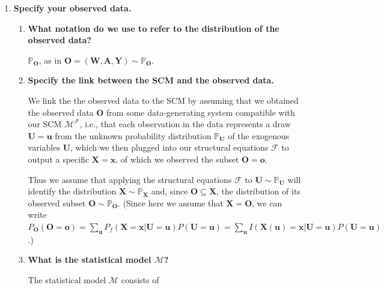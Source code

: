 \documentclass{article}\usepackage[]{graphicx}\usepackage[]{xcolor}
\begin{document}
\begin{enumerate}[label=\textbf{\arabic*.}]

  \item \textbf{Specify your observed data.}
  
  \begin{enumerate}[label=\textbf{(\alph*)}]
  
    \item \textbf{What notation do we use to refer to the distribution of the observed data?}
    
    $\mathbb{P}_{\bm{O}}$, as in $\bm{O} = (\bm{W}, \bm{A}, \bm{Y}) \sim \mathbb{P}_{\bm{O}}.$
  
    \item \textbf{Specify the link between the SCM and the observed data.}
    
We link the the observed data to the SCM by assuming that we obtained the observed data $\bm{O}$ from some data-generating system compatible with our SCM $\mathcal{M}^\mathcal{F}$, i.e., that each observation in the data represents a draw $\bm{U} = \bm{u}$ from the unknown probability distribution $\mathbb{P}_{\bm{U}}$ of the exogenous variables $\bm{U}$, which we then plugged into our structural equations $\mathcal{F}$ to output a specific $\bm{X} = \bm{x}$, of which we observed the subset $\bm{O} = \bm{o}$.
    
Thus we assume that applying the structural equations $\mathcal{F}$ to $\bm{U} \sim \mathbb{P}_{\bm{U}}$ will identify the distribution $\bm{X} \sim \mathbb{P}_{\bm{X}}$ and, since $\bm{O} \subseteq \bm{X}$, the distribution of its observed subset $\bm{O} \sim \mathbb{P}_{\bm{O}}$. (Since here we assume that $\bm{X} = \bm{O}$, we can write $P_{\bm{O}}(\bm{O} = \bm{o}) = \sum\limits_{\bm{u}}P_f(\bm{X}=\bm{x}|\bm{U}=\bm{u})P(\bm{U}=\bm{u}) = \sum\limits_{\bm{u}}I(\bm{X}(\bm{u})=\bm{x}|\bm{U}=\bm{u})P(\bm{U}=\bm{u})$.)
    
    \item \textbf{What is the statistical model $\mathcal{M}$?}
    
The statistical model $\mathcal{M}$ consists of 


\end{enumerate}
\end{enumerate}
\end{document}
